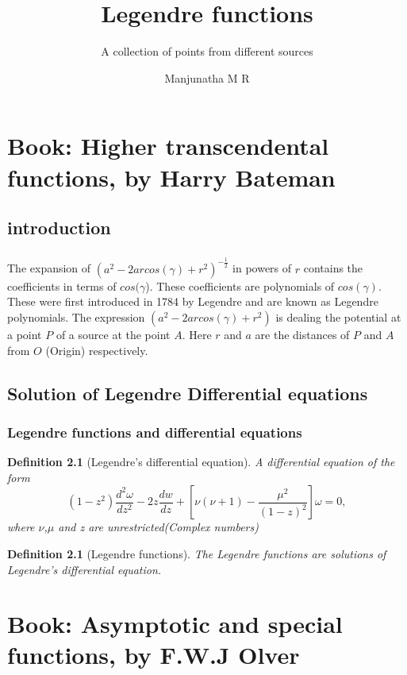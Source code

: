 \documentclass[english,12pt,a4paper,titlepage]{scrbook}
\title{Legendre functions}
\subtitle{A collection of points from different sources}
\author{Manjunatha M R}
\newtheorem{definition}[theorem]{Definition}
\begin{document}
	\maketitle %
	\tableofcontents %
	
	\part{Book: Higher transcendental functions, by Harry Bateman}
	\chapter{introduction}
	\section{}
	The expansion of $(a^2 - 2arcos(\gamma)+ r^2)^{-\frac{1}{2}}$ in powers of $r$ contains the coefficients in terms of $cos(\gamma$). These coefficients are polynomials of $cos(\gamma)$. These were first introduced in 1784 by Legendre and are known as Legendre polynomials. The expression $(a^2- 2arcos(\gamma)+ r^2)$ is dealing the potential at a point $P$ of a source at the point $A$. Here $r$ and $a$ are the distances of $P$ and $A$ from $O$ (Origin) respectively.  
	\chapter{Solution of Legendre Differential equations}
	\section{Legendre functions and differential equations}
	\begin{definition}
		[Legendre's differential equation] A differential equation of the form
		\[(1-z^2)\frac{d^2 \omega}{dz^2} -2z\frac{dw}{dz}+ [\nu(\nu+1) - \frac{\mu^2}{(1-z)^2}]\omega=0,\]
		where $\nu$,$\mu$ and z are unrestricted(Complex numbers)
	\end{definition}
	\begin{definition}[Legendre functions]\label{Legendre functions}
		The Legendre functions are solutions of Legendre's differential equation.
	\end{definition}
	\part{Book: Asymptotic and special functions, by F.W.J Olver}\label{part:two}
	\printindex
\end{document}
